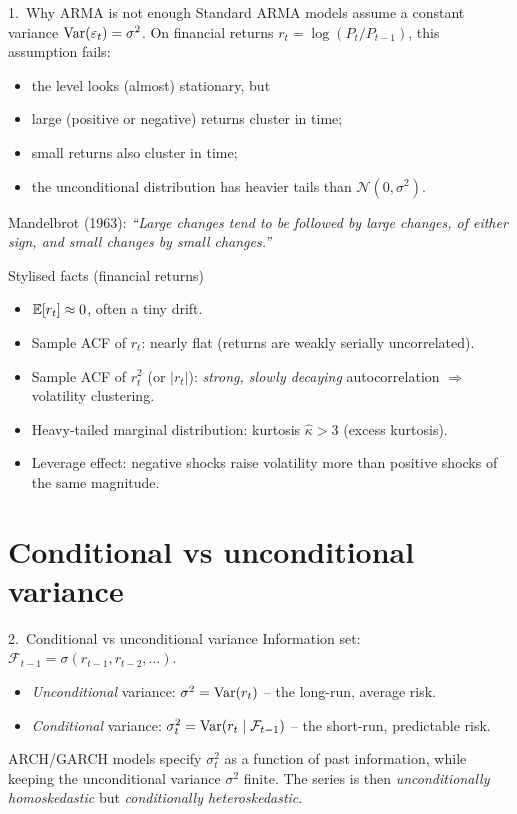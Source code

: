 \documentclass[aspectratio=169]{beamer}
\begin{document}
\begin{frame}{1.~Why ARMA is not enough}
  Standard ARMA models assume a constant variance
  $\mathrm{Var}(\varepsilon_t) = \sigma^2$. On financial returns
  $r_t = \log(P_t / P_{t-1})$, this assumption fails:
  \begin{itemize}
    \item the level looks (almost) stationary, but
    \item large (positive or negative) returns cluster in time;
    \item small returns also cluster in time;
    \item the unconditional distribution has heavier tails than
          $\mathcal N(0, \sigma^2)$.
  \end{itemize}
  \pause
  \alert{Mandelbrot (1963):} \emph{``Large changes tend to be
  followed by large changes, of either sign, and small changes by
  small changes.''}
\end{frame}

\begin{frame}{Stylised facts (financial returns)}
  \begin{itemize}
    \item $\mathbb{E}[r_t] \approx 0$, often a tiny drift.
    \item Sample ACF of $r_t$: nearly flat (returns are weakly
          serially uncorrelated).
    \item Sample ACF of $r_t^2$ (or $|r_t|$):
          \emph{strong, slowly decaying} autocorrelation
          $\Rightarrow$ \alert{volatility clustering}.
    \item Heavy-tailed marginal distribution: kurtosis
          $\widehat\kappa > 3$ (excess kurtosis).
    \item Leverage effect: negative shocks raise volatility more
          than positive shocks of the same magnitude.
  \end{itemize}
\end{frame}

\section{Conditional vs unconditional variance}

\begin{frame}{2.~Conditional vs unconditional variance}
  Information set: $\mathcal F_{t-1} = \sigma(r_{t-1}, r_{t-2}, \dots)$.
  \begin{itemize}
    \item \emph{Unconditional} variance:
          $\sigma^2 = \mathrm{Var}(r_t)$ -- the long-run, average risk.
    \item \emph{Conditional} variance:
          $\sigma_t^2 = \mathrm{Var}(r_t \mid \mathcal F_{t-1})$ -- the
          short-run, predictable risk.
  \end{itemize}
  \pause
  ARCH/GARCH models specify \emph{$\sigma_t^2$} as a function of
  past information, while keeping the unconditional variance
  $\sigma^2$ finite. The series is then
  \emph{unconditionally homoskedastic} but
  \emph{conditionally heteroskedastic}.
\end{frame}
\end{document}
